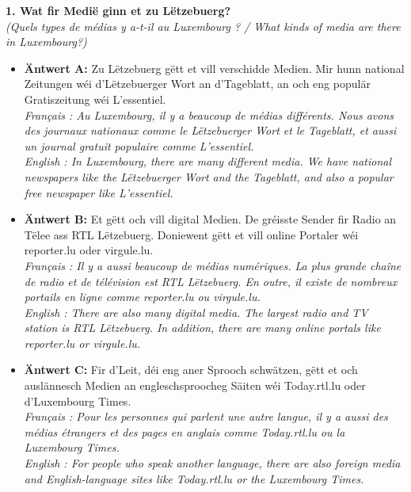 \vspace{1em}

\noindent\textbf{1. Wat fir Medië ginn et zu Lëtzebuerg?}\\
\textit{(Quels types de médias y a-t-il au Luxembourg ? / What kinds of media are there in Luxembourg?)}
\begin{itemize}
    \item \textbf{Äntwert A:} Zu Lëtzebuerg gëtt et vill verschidde Medien. Mir hunn national Zeitungen wéi d'Lëtzebuerger Wort an d'Tageblatt, an och eng populär Gratiszeitung wéi L'essentiel.\\
    \textit{Français : Au Luxembourg, il y a beaucoup de médias différents. Nous avons des journaux nationaux comme le Lëtzebuerger Wort et le Tageblatt, et aussi un journal gratuit populaire comme L'essentiel.}\\
    \textit{English : In Luxembourg, there are many different media. We have national newspapers like the Lëtzebuerger Wort and the Tageblatt, and also a popular free newspaper like L'essentiel.}
    \item \textbf{Äntwert B:} Et gëtt och vill digital Medien. De gréisste Sender fir Radio an Tëlee ass RTL Lëtzebuerg. Doniewent gëtt et vill online Portaler wéi reporter.lu oder virgule.lu.\\
    \textit{Français : Il y a aussi beaucoup de médias numériques. La plus grande chaîne de radio et de télévision est RTL Lëtzebuerg. En outre, il existe de nombreux portails en ligne comme reporter.lu ou virgule.lu.}\\
    \textit{English : There are also many digital media. The largest radio and TV station is RTL Lëtzebuerg. In addition, there are many online portals like reporter.lu or virgule.lu.}
    \item \textbf{Äntwert C:} Fir d'Leit, déi eng aner Sprooch schwätzen, gëtt et och auslännesch Medien an engleschsproocheg Säiten wéi Today.rtl.lu oder d'Luxembourg Times.\\
    \textit{Français : Pour les personnes qui parlent une autre langue, il y a aussi des médias étrangers et des pages en anglais comme Today.rtl.lu ou la Luxembourg Times.}\\
    \textit{English : For people who speak another language, there are also foreign media and English-language sites like Today.rtl.lu or the Luxembourg Times.}
\end{itemize}
\vspace{0.5em}

